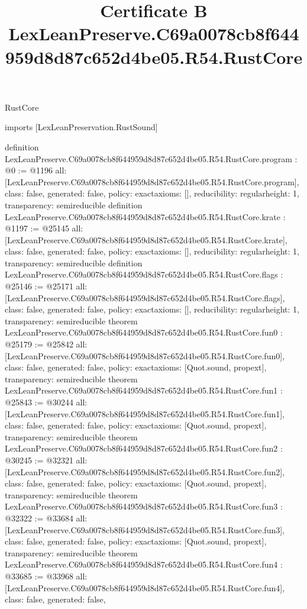 \begin{lexlean}{RustCore}
\title{Certificate B LexLeanPreserve.C69a0078cb8f644959d8d87c652d4be05.R54.RustCore}
\begin{coremodule}
imports [LexLeanPreservation.RustSound]

definition LexLeanPreserve.C69a0078cb8f644959d8d87c652d4be05.R54.RustCore.program : @0 := @1196 {
  all: [LexLeanPreserve.C69a0078cb8f644959d8d87c652d4be05.R54.RustCore.program],
  class: false,
  generated: false,
  policy: exact{axioms: []},
  reducibility: regular{height: 1},
  transparency: semireducible
}
definition LexLeanPreserve.C69a0078cb8f644959d8d87c652d4be05.R54.RustCore.krate : @1197 := @25145 {
  all: [LexLeanPreserve.C69a0078cb8f644959d8d87c652d4be05.R54.RustCore.krate],
  class: false,
  generated: false,
  policy: exact{axioms: []},
  reducibility: regular{height: 1},
  transparency: semireducible
}
definition LexLeanPreserve.C69a0078cb8f644959d8d87c652d4be05.R54.RustCore.flags : @25146 := @25171 {
  all: [LexLeanPreserve.C69a0078cb8f644959d8d87c652d4be05.R54.RustCore.flags],
  class: false,
  generated: false,
  policy: exact{axioms: []},
  reducibility: regular{height: 1},
  transparency: semireducible
}
theorem LexLeanPreserve.C69a0078cb8f644959d8d87c652d4be05.R54.RustCore.fun0 : @25179 := @25842 {
  all: [LexLeanPreserve.C69a0078cb8f644959d8d87c652d4be05.R54.RustCore.fun0],
  class: false,
  generated: false,
  policy: exact{axioms: [Quot.sound, propext]},
  transparency: semireducible
}
theorem LexLeanPreserve.C69a0078cb8f644959d8d87c652d4be05.R54.RustCore.fun1 : @25843 := @30244 {
  all: [LexLeanPreserve.C69a0078cb8f644959d8d87c652d4be05.R54.RustCore.fun1],
  class: false,
  generated: false,
  policy: exact{axioms: [Quot.sound, propext]},
  transparency: semireducible
}
theorem LexLeanPreserve.C69a0078cb8f644959d8d87c652d4be05.R54.RustCore.fun2 : @30245 := @32321 {
  all: [LexLeanPreserve.C69a0078cb8f644959d8d87c652d4be05.R54.RustCore.fun2],
  class: false,
  generated: false,
  policy: exact{axioms: [Quot.sound, propext]},
  transparency: semireducible
}
theorem LexLeanPreserve.C69a0078cb8f644959d8d87c652d4be05.R54.RustCore.fun3 : @32322 := @33684 {
  all: [LexLeanPreserve.C69a0078cb8f644959d8d87c652d4be05.R54.RustCore.fun3],
  class: false,
  generated: false,
  policy: exact{axioms: [Quot.sound, propext]},
  transparency: semireducible
}
theorem LexLeanPreserve.C69a0078cb8f644959d8d87c652d4be05.R54.RustCore.fun4 : @33685 := @33968 {
  all: [LexLeanPreserve.C69a0078cb8f644959d8d87c652d4be05.R54.RustCore.fun4],
  class: false,
  generated: false,
}
\end{coremodule}
\end{lexlean}
